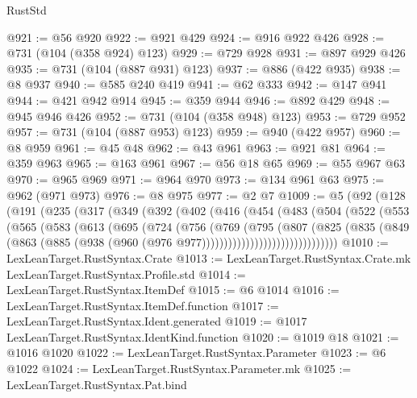 \begin{lexlean}{RustStd}
\begin{coremodule}
@921 := @56 @920
@922 := @921 @429
@924 := @916 @922 @426
@928 := @731 (@104 (@358 @924) @123)
@929 := @729 @928
@931 := @897 @929 @426
@935 := @731 (@104 (@887 @931) @123)
@937 := @886 (@422 @935)
@938 := @8 @937
@940 := @585 @240 @419
@941 := @62 @333
@942 := @147 @941
@944 := @421 @942 @914
@945 := @359 @944
@946 := @892 @429
@948 := @945 @946 @426
@952 := @731 (@104 (@358 @948) @123)
@953 := @729 @952
@957 := @731 (@104 (@887 @953) @123)
@959 := @940 (@422 @957)
@960 := @8 @959
@961 := @45 @48
@962 := @43 @961
@963 := @921 @81
@964 := @359 @963
@965 := @163 @961
@967 := @56 @18 @65
@969 := @55 @967 @63
@970 := @965 @969
@971 := @964 @970
@973 := @134 @961 @63
@975 := @962 (@971 @973)
@976 := @8 @975
@977 := @2 @7
@1009 := @5
    (@92
      (@128
        (@191
          (@235
            (@317
              (@349
                (@392
                  (@402
                    (@416
                      (@454
                        (@483
                          (@504
                            (@522
                              (@553
                                (@565
                                  (@583
                                    (@613
                                      (@695
                                        (@724
                                          (@756
                                            (@769
                                              (@795
                                                (@807
                                                  (@825
                                                    (@835
                                                      (@849
                                                        (@863
                                                          (@885
                                                            (@938
                                                              (@960
                                                                (@976
                                                                  @977)))))))))))))))))))))))))))))))
@1010 := LexLeanTarget.RustSyntax.Crate
@1013 := LexLeanTarget.RustSyntax.Crate.mk LexLeanTarget.RustSyntax.Profile.std
@1014 := LexLeanTarget.RustSyntax.ItemDef
@1015 := @6 @1014
@1016 := LexLeanTarget.RustSyntax.ItemDef.function
@1017 := LexLeanTarget.RustSyntax.Ident.generated
@1019 := @1017 LexLeanTarget.RustSyntax.IdentKind.function
@1020 := @1019 @18
@1021 := @1016 @1020
@1022 := LexLeanTarget.RustSyntax.Parameter
@1023 := @6 @1022
@1024 := LexLeanTarget.RustSyntax.Parameter.mk
@1025 := LexLeanTarget.RustSyntax.Pat.bind

\end{coremodule}
\end{lexlean}
